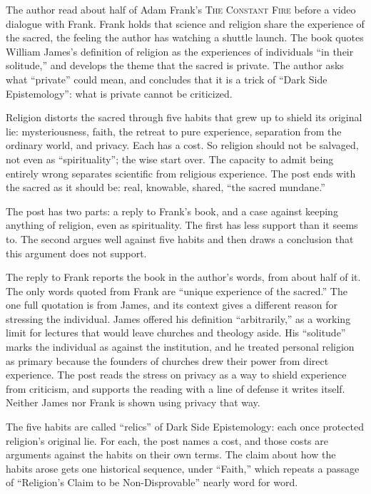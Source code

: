 \begin{afterword}
\summaryhead

The author read about half of Adam Frank's \textsc{The Constant Fire} before a video dialogue with Frank. Frank holds that science and religion share the experience of the sacred, the feeling the author has watching a shuttle launch. The book quotes William James's definition of religion as the experiences of individuals ``in their solitude,'' and develops the theme that the sacred is private. The author asks what ``private'' could mean, and concludes that it is a trick of ``Dark Side Epistemology'': what is private cannot be criticized.

Religion distorts the sacred through five habits that grew up to shield its original lie: mysteriousness, faith, the retreat to pure experience, separation from the ordinary world, and privacy. Each has a cost. So religion should not be salvaged, not even as ``spirituality''; the wise start over. The capacity to admit being entirely wrong separates scientific from religious experience. The post ends with the sacred as it should be: real, knowable, shared, ``the sacred mundane.''

\responsehead

The post has two parts: a reply to Frank's book, and a case against keeping anything of religion, even as spirituality. The first has less support than it seems to. The second argues well against five habits and then draws a conclusion that this argument does not support.

The reply to Frank reports the book in the author's words, from about half of it. The only words quoted from Frank are ``unique experience of the sacred.'' The one full quotation is from James, and its context gives a different reason for stressing the individual. James offered his definition ``arbitrarily,'' as a working limit for lectures that would leave churches and theology aside. His ``solitude'' marks the individual as against the institution, and he treated personal religion as primary because the founders of churches drew their power from direct experience. The post reads the stress on privacy as a way to shield experience from criticism, and supports the reading with a line of defense it writes itself. Neither James nor Frank is shown using privacy that way.

The five habits are called ``relics'' of Dark Side Epistemology: each once protected religion's original lie. For each, the post names a cost, and those costs are arguments against the habits on their own terms. The claim about how the habits arose gets one historical sequence, under ``Faith,'' which repeats a passage of ``Religion's Claim to be Non-Disprovable'' nearly word for word.


\end{afterword}
